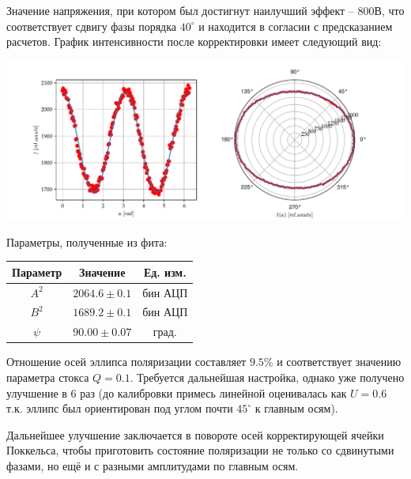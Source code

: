 \documentclass[12pt]{article}
\begin{document}
Значение напряжения, при котором был достигнут наилучший эффект -- 800В, что соответствует сдвигу фазы порядка $40^{\circ}$ и находится в согласии с предсказанием расчетов. 
График интенсивности после корректировки имеет следующий вид: 
\begin{center}
	\includegraphics[width=16cm]{img/I_plot_corr}
	\label{fig:/I_plot_corr}
\end{center}
Параметры, полученные из фита: 
\begin{center}
	\begin{tabular}{|c|c|c|} 
		\hline
		Параметр & Значение & Ед. изм.\\
		\hline
		$A^2$ & $2064.6\pm0.1$ & бин АЦП \\ 
		\hline
		$B^2$ & $1689.2\pm0.1$ & бин АЦП \\ 
		\hline
		$\psi$ & $90.00\pm0.07$ & град. \\
		\hline
	\end{tabular}
\end{center}
Отношение осей эллипса поляризации составляет $9.5\%$ и соответствует значению параметра стокса $Q=0.1$. Требуется дальнейшая настройка, однако уже получено улучшение в 6 раз (до калибровки примесь линейной оценивалась как $U=0.6$ т.к. эллипс был ориентирован под углом почти $45^{\circ}$ к главным осям).\par
Дальнейшее улучшение заключается в повороте осей корректирующей ячейки Поккельса, чтобы приготовить состояние поляризации не только со сдвинутыми фазами, но ещё и с разными амплитудами по главным осям.  


\vfill
\end{document}
